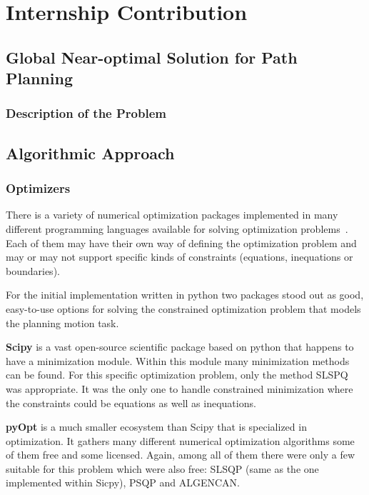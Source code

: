 \part{Internship Contribution}

\chapter{Global Near-optimal Solution for Path Planning}
\lipsum[1]
\section{Description of the Problem}

\chapter{Algorithmic Approach}
\lipsum[1]
\newpage

\section{Optimizers}

There is a variety of numerical optimization packages implemented in many different programming languages available for solving optimization problems~\cite{pyopt-paper}. Each of them may have their own way of defining the optimization problem and may or may not support specific kinds of constraints (equations, inequations or boundaries).

For the initial implementation written in python two packages stood out as good, easy-to-use options for solving the constrained optimization problem that models the planning motion task.

\textbf{Scipy} is a vast open-source scientific package based on python that happens to have a minimization module. Within this module many minimization methods can be found. For this specific optimization problem, only the method SLSPQ was appropriate. It was the only one to handle constrained minimization where the constraints could be equations as well as inequations.

\textbf{pyOpt} is a much smaller ecosystem than Scipy that is specialized in optimization. It gathers many different numerical optimization algorithms some of them free and some licensed. Again, among all of them there were only a few suitable for this problem which were also free: SLSQP (same as the one implemented within Sicpy), PSQP and ALGENCAN.

